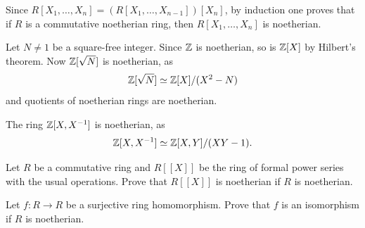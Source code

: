 Since $R[X_1,\dots,X_n]=(R[X_1,\dots,X_{n-1}])[X_n]$, by induction 
one proves that if $R$ is a commutative noetherian ring, 
then $R[X_1,\dots,X_n]$ is noetherian. 
 
\begin{example}
    Let $N\ne1$ be a square-free integer.  
	Since $\mathbb{Z}$ is noetherian, so is $\mathbb{Z}[X]$ by Hilbert's theorem. Now 
	$\mathbb{Z}[\sqrt{N}]$ is noetherian, as \[
    \mathbb{Z}[\sqrt{N}]\simeq\mathbb{Z}[X]/(X^2-N)
    \]
    and quotients
	of noetherian rings are noetherian.  	
\end{example}

\begin{example}
	The ring $\mathbb{Z}[X,X^{-1}]$ is noetherian, as 
    \[
    \mathbb{Z}[X,X^{-1}]\simeq\mathbb{Z}[X,Y]/(XY-1).
    \]
\end{example}
 

\begin{exercise}
\label{xca:Hilbert_powerseries}
   Let $R$ be a commutative ring and $R[\![X]\!]$ be the ring of formal power series with the usual operations.
   Prove that $R[\![X]\!]$ is noetherian if $R$ is noetherian.
\end{exercise}

\begin{exercise}
	Let $f\colon R\to R$ be a surjective ring homomorphism. Prove that $f$ is an isomorphism
	if $R$ is noetherian. 	
\end{exercise}


